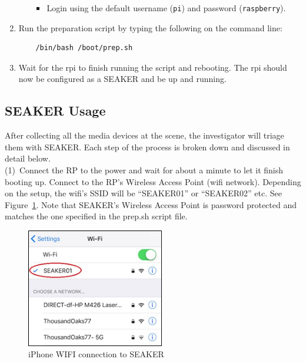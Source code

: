 \documentclass[12pt]{article}
\begin{document}
\begin{enumerate}
\begin{itemize}
\begin{itemize}
\begin{verbatim}
        \end{verbatim}
        \item Login using the default username (\verb|pi|) and password
        (\verb|raspberry|).
      \end{itemize}
    \end{itemize}
  \item Run the preparation script by typing the following on the command line:
  \begin{verbatim}
    /bin/bash /boot/prep.sh
  \end{verbatim}
  \item Wait for the \gls{rpi} to finish running the script and
  rebooting. The \gls{rpi} should now be configured as a SEAKER
  and be up and running.
\end{enumerate}

\newpage
\subsection{SEAKER Usage}

After collecting all the media devices at the scene, the investigator
will triage them with SEAKER.  Each step of the process is broken
down and discussed in detail below.\\

(1)~Connect the RP to the power and wait for about a minute
to let it finish booting up.
Connect to the RP's Wireless Access Point (\gls{wifi} network). Depending
on the setup, the \gls{wifi}'s SSID will be ``SEAKER01'' or ``SEAKER02''
etc.  See Figure~\ref{fig:screen-1}. Note that SEAKER's Wireless Access
Point is password
protected and matches the one specified in the prep.sh script file.\\

\begin{figure}[ht]
  \begin{center}
  \includegraphics[width=6cm]{images/seaker-hh-screen-1.jpg}
  \caption{iPhone WIFI connection to SEAKER}
  \label{fig:screen-1}
  \end{center} 
\end{figure}
\end{document}
